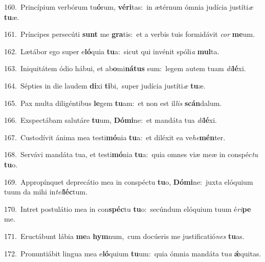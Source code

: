 {\numbfont\textcolor{\numbcolor}{160.}}~Princípium verbórum tu\-\textbf{ó}\-rum, \textbf{vé}\-\textbf{ri}tas:~\star in ætérnum ómnia judícia justíti\textit{æ} \textbf{tu}\-æ.\par
{\numbfont\textcolor{\numbcolor}{161.}}~Príncipes persecúti \textbf{sunt} me \textbf{gra}\-tis:~\star et a verbis tuis formidávit \textit{cor} \textbf{me}\-um.\par
{\numbfont\textcolor{\numbcolor}{162.}}~Lætábor ego super e\-\textbf{ló}\-quia \textbf{tu}\-a:~\star sicut qui invénit spóli\textit{a} \textbf{mul}\-ta.\par
{\numbfont\textcolor{\numbcolor}{163.}}~Iniquitátem ódio hábui, et ab\-\textbf{o}\-mi\-\textbf{ná}\-\textbf{tus} sum:~\star legem autem tuam \textit{di}\-\textbf{lé}xi.\par
{\numbfont\textcolor{\numbcolor}{164.}}~Sépties in die laudem \textbf{di}\-xi \textbf{ti}\-bi,~\star super judícia justíti\textit{æ} \textbf{tu}\-æ.\par
{\numbfont\textcolor{\numbcolor}{165.}}~Pax multa diligéntibus \textbf{le}\-gem \textbf{tu}\-am:~\star et non est il\textit{lis} \textbf{scán}\-dalum.\par
{\numbfont\textcolor{\numbcolor}{166.}}~Exspectábam salutáre \textbf{tu}\-um, \textbf{Dó}\-\textbf{mi}ne:~\star et mandáta tua \textit{di}\-\textbf{lé}xi.\par
{\numbfont\textcolor{\numbcolor}{167.}}~Custodívit ánima mea testi\-\textbf{mó}\-nia \textbf{tu}\-a:~\star et diléxit ea ve\-\textit{he}\-\textbf{mén}ter.\par
{\numbfont\textcolor{\numbcolor}{168.}}~Servávi mandáta tua, et testi\-\textbf{mó}\-nia \textbf{tu}\-a:~\star quia omnes viæ meæ in conspéc\textit{tu} \textbf{tu}\-o.\par
{\numbfont\textcolor{\numbcolor}{169.}}~Appropínquet deprecátio mea in conspéctu \textbf{tu}\-o, \textbf{Dó}\-\textbf{mi}ne:~\star juxta elóquium tuum da mihi in\-\textit{tel}\-\textbf{léc}tum.\par
{\numbfont\textcolor{\numbcolor}{170.}}~Intret postulátio mea in con\-\textbf{spéc}\-tu \textbf{tu}\-o:~\star secúndum elóquium tuum é\-\textit{ri}\-\textbf{pe} me.\par
{\numbfont\textcolor{\numbcolor}{171.}}~Eructábunt lábia \textbf{me}\-a \textbf{hym}\-num,~\star cum docúeris me justificatió\textit{nes} \textbf{tu}\-as.\par
{\numbfont\textcolor{\numbcolor}{172.}}~Pronuntiábit lingua mea e\-\textbf{ló}\-quium \textbf{tu}\-um:~\star quia ómnia mandáta tu\textit{a} \textbf{ǽ}\-quitas.\par
